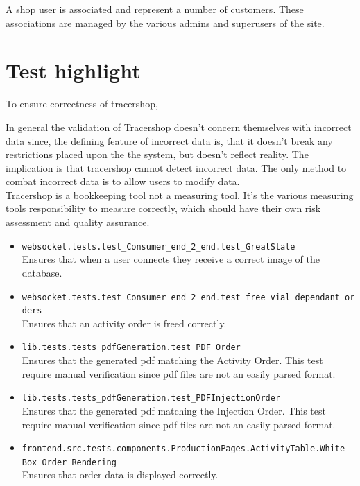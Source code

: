 \documentclass{article}
\begin{document}
A shop user is associated and represent a number of customers. These associations are managed by the various admins and superusers of the site.

\section*{Test highlight}

To ensure correctness of tracershop, 

In general the validation of Tracershop doesn't concern themselves with \gls{incorrect data} since, the defining feature of incorrect data is,
that it doesn't break any restrictions placed upon the the system, but doesn't reflect reality. The implication is that tracershop cannot detect incorrect data.
The only method to combat \gls{incorrect data} is to allow users to modify data.\\
Tracershop is a bookkeeping tool not a measuring tool. It's the various measuring tools responsibility to measure correctly, which should have their own risk assessment and quality assurance.

\begin{itemize}
  \item \texttt{websocket.tests.test\_Consumer\_end\_2\_end.test\_GreatState}\\
  Ensures that when a user connects they receive a correct image of the database.
  \item \texttt{websocket.tests.test\_Consumer\_end\_2\_end.test\_free\_vial\_dependant\_orders}\\
  Ensures that an activity order is freed correctly.
  \item \texttt{lib.tests.tests\_pdfGeneration.test\_PDF\_Order}\\
  Ensures that the generated pdf matching the Activity Order. This test require manual verification since pdf files are not an easily parsed format.
  \item \texttt{lib.tests.tests\_pdfGeneration.test\_PDFInjectionOrder}\\
  Ensures that the generated pdf matching the Injection Order. This test require manual verification since pdf files are not an easily parsed format.
  \item \texttt{frontend.src.tests.components.ProductionPages.ActivityTable.White Box Order Rendering}\\
  Ensures that order data is displayed correctly.
\end{itemize}
\end{document}
